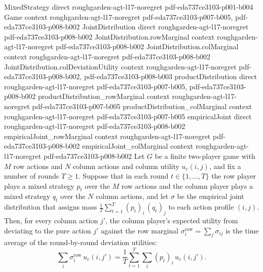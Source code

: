 \begin{lemma}
\label{empiricalJoint_colDeviationUtility}
\leanok
{}
\proofstep
  {MixedStrategy}
  {direct}
  {roughgarden-agt-l17-noregret}
  {pdf-eda737ce3103-p001-b004}
\proofstep
  {Game}
  {context}
  {roughgarden-agt-l17-noregret}
  {pdf-eda737ce3103-p007-b005,
    pdf-eda737ce3103-p008-b002}
\proofstep
  {JointDistribution}
  {direct}
  {roughgarden-agt-l17-noregret}
  {pdf-eda737ce3103-p008-b002}
\proofstep
  {JointDistribution.rowMarginal}
  {context}
  {roughgarden-agt-l17-noregret}
  {pdf-eda737ce3103-p008-b002}
\proofstep
  {JointDistribution.colMarginal}
  {context}
  {roughgarden-agt-l17-noregret}
  {pdf-eda737ce3103-p008-b002}
\proofstep
  {JointDistribution.colDeviationUtility}
  {context}
  {roughgarden-agt-l17-noregret}
  {pdf-eda737ce3103-p008-b002,
    pdf-eda737ce3103-p008-b003}
\proofstep
  {productDistribution}
  {direct}
  {roughgarden-agt-l17-noregret}
  {pdf-eda737ce3103-p007-b005,
    pdf-eda737ce3103-p008-b002}
\proofstep
  {productDistribution_rowMarginal}
  {context}
  {roughgarden-agt-l17-noregret}
  {pdf-eda737ce3103-p007-b005}
\proofstep
  {productDistribution_colMarginal}
  {context}
  {roughgarden-agt-l17-noregret}
  {pdf-eda737ce3103-p007-b005}
\proofstep
  {empiricalJoint}
  {direct}
  {roughgarden-agt-l17-noregret}
  {pdf-eda737ce3103-p008-b002}
\proofstep
  {empiricalJoint_rowMarginal}
  {context}
  {roughgarden-agt-l17-noregret}
  {pdf-eda737ce3103-p008-b002}
\proofstep
  {empiricalJoint_colMarginal}
  {context}
  {roughgarden-agt-l17-noregret}
  {pdf-eda737ce3103-p008-b002}
Let $G$ be a finite two-player game with $M$ row actions and $N$ column actions and
column utility $u_c(i,j)$, and fix a number of rounds $T \ge 1$. Suppose that in each
round $t \in \{1,\dots,T\}$ the row player plays a mixed strategy $p_t$ over the $M$ row
actions and the column player plays a mixed strategy $q_t$ over the $N$ column actions,
and let $\sigma$ be the empirical joint distribution that assigns mass
$\frac{1}{T}\sum_{t=1}^{T} (p_t)_i\,(q_t)_j$ to each action profile $(i,j)$. Then, for
every column action $j'$, the column player's expected utility from deviating to the
pure action $j'$ against the row marginal $\sigma^{\mathrm{row}}_i = \sum_{j}
\sigma_{ij}$ is the time average of the round-by-round deviation utilities:
\[
  \sum_{i} \sigma^{\mathrm{row}}_i\, u_c(i,j')
  = \frac{1}{T}\sum_{t=1}^{T}\sum_{i} (p_t)_i\, u_c(i,j').
\]
\end{lemma}

